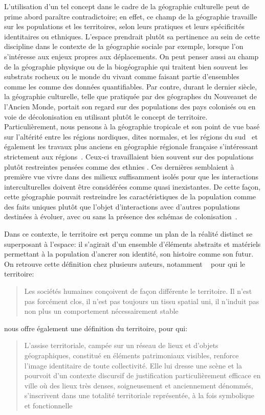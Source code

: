 L'utilisation d'un tel concept dans le cadre de la géographie culturelle peut de prime abord paraître contradictoire; en effet, ce champ de la géographie travaille  sur les populations et les territoires, selon leurs pratiques et leurs spécificités identitaires ou ethniques.
L'espace prendrait plutôt sa pertinence au sein de cette discipline dans le contexte de la géographie sociale par exemple, lorsque l'on s'intéresse aux enjeux propres aux déplacements.
On peut penser aussi au champ de la géographie physique ou de la biogéographie qui traitent bien souvent les substrats rocheux ou le monde du vivant comme faisant partie d'ensembles comme les  comme des données quantifiables.
Par contre, durant le dernier siècle, la géographie culturelle, telle que pratiquée par des géographes du Nouveau\missref et de l'Ancien Monde\missref, portait son regard sur des populations des pays colonisés ou en voie de décolonisation en utilisant plutôt le concept de territoire.
Particulièrement, nous pensons à la géographie tropicale et son point de vue basé sur l'altérité entre les régions nordiques, dites normales, et les régions du sud~\citep[493]{Power2009} et également les travaux plus anciens en géographie régionale française s'intéressant strictement aux régions~\citep[31]{Courville1991}.
Ceux-ci travaillaient bien souvent sur des populations plutôt restreintes pensées comme des ethnies .
Ces dernières semblaient à première vue vivre dans des milieux suffisamment isolés pour que les interactions interculturelles doivent être considérées comme quasi inexistantes.
De cette façon, cette géographie pouvait restreindre les caractéristiques de la population comme des faits uniques plutôt que l'objet d'interactions avec d'autres populations destinées à évoluer, avec ou sans la présence des schémas de colonisation~\citep[79--80]{DiMeo2007}.

Dans ce contexte, le territoire est perçu comme un plan de la réalité distinct se superposant à l'espace: il s'agirait d'un ensemble d'éléments abstraits et matériels permettant à la population d'ancrer son identité, son histoire comme son futur.
On retrouve cette définition chez plusieurs auteurs, notamment ~\citeauthor{Bonnemaison1981} pour qui le territoire:
\blockquote[{\cite[253]{Bonnemaison1981}}][.]{Les sociétés humaines conçoivent de façon différente le territoire. Il n'est pas forcément clos, il n'est pas toujours un tissu spatial uni, il n'induit pas non plus un comportement nécessairement stable}.
\citeauthor{DiMeo2007} nous offre également une définition du territoire, pour qui:
\blockquote[{\cite[76]{DiMeo2007}}][.]{L’assise territoriale, campée sur un réseau de lieux et d’objets géographiques, constitué en éléments patrimoniaux visibles, renforce l’image identitaire de toute collectivité. Elle lui dresse une scène et la pourvoit d’un contexte discursif de justification particulièrement efficace en ville où des lieux très denses, soigneusement et anciennement dénommés, s’inscrivent dans une totalité territoriale représentée, à la fois symbolique et fonctionnelle}. 

